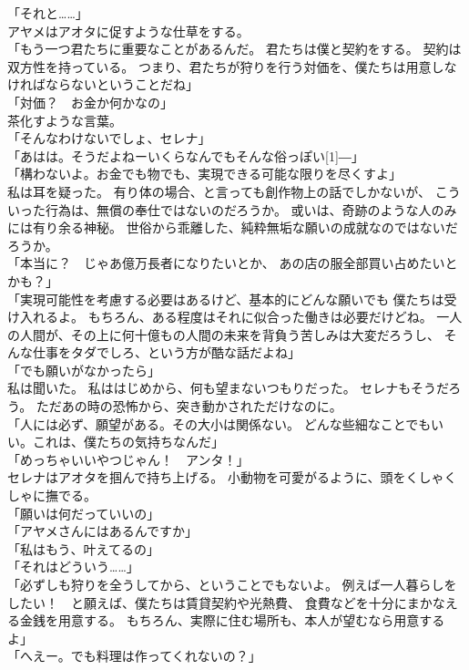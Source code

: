 \documentclass[../IHMain]{subfiles}
\begin{document}
「それと……」\\
アヤメはアオタに促すような仕草をする。\\
「もう一つ君たちに重要なことがあるんだ。
君たちは僕と契約をする。
契約は双方性を持っている。
つまり、君たちが狩りを行う対価を、僕たちは用意しなければならないということだね」\\
「対価？　お金か何かなの」\\
茶化すような言葉。\\
「そんなわけないでしょ、セレナ」\\
「あはは。そうだよねーいくらなんでもそんな俗っぽい\scalebox{3}[1]{―}」\\
「構わないよ。お金でも物でも、実現できる可能な限りを尽くすよ」\\
私は耳を疑った。
有り体の場合、と言っても創作物上の話でしかないが、
こういった行為は、無償の奉仕ではないのだろうか。
或いは、奇跡のような人のみには有り余る神秘。
世俗から乖離した、純粋無垢な願いの成就なのではないだろうか。\\
「本当に？　じゃあ億万長者になりたいとか、
あの店の服全部買い占めたいとかも？」\\
「実現可能性を考慮する必要はあるけど、基本的にどんな願いでも
僕たちは受け入れるよ。
もちろん、ある程度はそれに似合った働きは必要だけどね。
一人の人間が、その上に何十億もの人間の未来を背負う苦しみは大変だろうし、
そんな仕事をタダでしろ、という方が酷な話だよね」\\
「でも願いがなかったら」\\
私は聞いた。
私ははじめから、何も望まないつもりだった。
セレナもそうだろう。
ただあの時の恐怖から、突き動かされただけなのに。\\
「人には必ず、願望がある。その大小は関係ない。
どんな些細なことでもいい。これは、僕たちの気持ちなんだ」\\
「めっちゃいいやつじゃん！　アンタ！」\\
セレナはアオタを掴んで持ち上げる。
小動物を可愛がるように、頭をくしゃくしゃに撫でる。\\
「願いは何だっていいの」\\
「アヤメさんにはあるんですか」\\
「私はもう、叶えてるの」\\
「それはどういう……」\\
「必ずしも狩りを全うしてから、ということでもないよ。
例えば一人暮らしをしたい！　と願えば、僕たちは賃貸契約や光熱費、
食費などを十分にまかなえる金銭を用意する。
もちろん、実際に住む場所も、本人が望むなら用意するよ」\\
「へえー。でも料理は作ってくれないの？」\\
\end{document}

